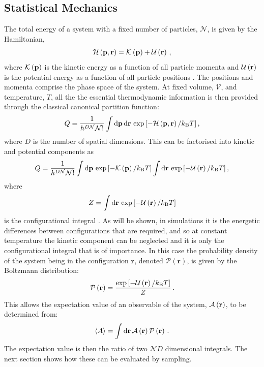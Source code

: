 \subsection{Statistical Mechanics}

The total energy of a system with a fixed number of particles, $\mathcal{N}$, is given by the Hamiltonian,
\begin{equation}
	\mathcal{H}\left(\mathbf{p},\mathbf{r}\right) = \mathcal{K}\left(\mathbf{p}\right)+\mathcal{U}\left(\mathbf{r}\right) \,,
\end{equation}
where $\mathcal{K}\left(\mathbf{p}\right)$ is the kinetic energy as a function of all particle momenta and $\mathcal{U}\left(\mathbf{r}\right)$ is the potential energy as a function of all particle positions \cite{Frenkel2002}.
The positions and momenta comprise the phase space of the system.
At fixed volume, $\mathcal{V}$, and temperature, $T$, all the the essential thermodynamic information is then provided through the classical canonical partition function:
\begin{equation}
	Q = \frac{1}{h^{D\mathcal{N}}\mathcal{N}!}\int \text{d}\mathbf{p}\,\text{d}\mathbf{r}\,\exp{\left[-\mathcal{H}\left(\mathbf{p},\mathbf{r}\right)/ k_\text{B}T\right]}\,,
\end{equation}
where $D$ is the number of spatial dimensions.
This can be factorised into kinetic and potential components as
\begin{equation}
	Q = \frac{1}{h^{D\mathcal{N}}\mathcal{N}!}\int \text{d}\mathbf{p}\,\exp{\left[-\mathcal{K}\left(\mathbf{p}\right)/k_\text{B}T\right]} \int \text{d}\mathbf{r}\,\exp{\left[-\mathcal{U}\left(\mathbf{r}\right)/k_\text{B}T\right]} \,,
\end{equation}
where
\begin{equation}
	Z = \int \text{d}\mathbf{r}\,\exp{\left[-\mathcal{U}\left(\mathbf{r}\right)/k_\text{B}T\right]}
\end{equation}
is the configurational integral \cite{Allen2017}. 
As will be shown, in \mc{} simulations it is the energetic differences between configurations that are required, and so at constant temperature the kinetic component can be neglected and it is only the configurational integral that is of importance.
In this case the probability density of the system being in the configuration $\mathbf{r}$, denoted $\mathcal{P}\left(\mathbf{r}\right)$, is given by the Boltzmann distribution:
\begin{equation}
	\label{eq:boltzmann}
	\mathcal{P}\left(\mathbf{r}\right) = \frac{\exp{\left[-\mathcal{U}\left(\mathbf{r}\right)/k_\text{B}T\right]}}{Z}\,.
\end{equation}
This allows the expectation value of an observable of the system, $\mathcal{A}\left(\mathbf{r}\right)$, to be determined from:
\begin{equation}
	\label{eq:expectationobs}
		\langle A \rangle = \int \text{d}\mathbf{r}\,\mathcal{A}\left(\mathbf{r}\right) \mathcal{P}\left(\mathbf{r}\right) \,.
\end{equation} 
The expectation value is then the ratio of two $\mathcal{N}D$ dimensional integrals.
The next section shows how these can be evaluated by \mc{} sampling.

